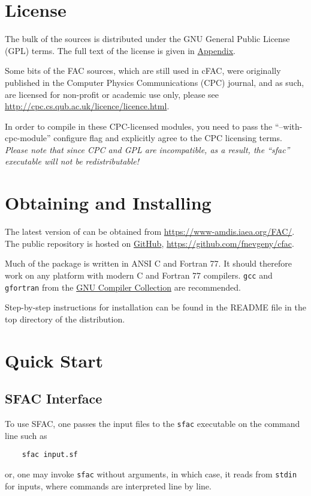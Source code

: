\section{License}
The bulk of the \cFAC sources is distributed under the GNU General Public
License (GPL) terms. The full text of the license is given in
\hyperref[GPL]{Appendix}.

Some bits of the FAC sources, which are still used in cFAC, were originally
published in the Computer Physics Communications (CPC) journal, and as such, are
licensed for non-profit or academic use only, please see
\url{http://cpc.cs.qub.ac.uk/licence/licence.html}.

In order to compile in these CPC-licensed modules, you need to pass the
``--with-cpc-module'' configure flag and explicitly agree to the CPC licensing
terms. {\em Please note that since CPC and GPL are incompatible, as a result,
the ``sfac'' executable will not be redistributable!}

\section{Obtaining and Installing \cFAC}
\label{sec:install}
The latest version of \cFAC can be obtained from
\url{https://www-amdis.iaea.org/FAC/}. The public repository is hosted on
\href{https://github.com}{GitHub}, \url{https://github.com/fnevgeny/cfac}.

Much of the \cFAC package is written in ANSI C and Fortran 77. It should 
therefore work on any platform with modern C and Fortran 77 compilers.
\verb|gcc| and \verb|gfortran| from the
\href{https://gcc.gnu.org/}{GNU Compiler Collection} are recommended.

Step-by-step instructions for installation can be found in the README file in
the top directory of the \cFAC distribution.

\section{Quick Start}
\label{sec:start}
\subsection{SFAC Interface}
To use SFAC, one passes the
input files to the \verb|sfac| executable on
the command line such as 
\begin{verbatim}
    sfac input.sf
\end{verbatim}
or, one may invoke \verb|sfac| without arguments, in which
case, it reads from \verb|stdin| for inputs, where commands are interpreted
line by line.

